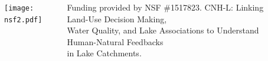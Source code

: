 \documentclass[final,hyperref={pdfpagelabels=false}]{beamer}
\begin{document}
\begin{frame}[t]
\begin{columns}[t]
\end{columns} %

\begin{columns}
\begin{column}{.015\textwidth}\end{column} %

\begin{column}{.25\textwidth}
\begin{flushright}
\texttt{[image: nsf2.pdf]} 
\end{flushright}
\end{column}

\begin{column}{.45\textwidth}
\small Funding provided by NSF \#1517823. CNH-L: Linking Land-Use Decision Making, \\
 \small Water Quality, and Lake Associations to Understand Human-Natural Feedbacks \\
 in Lake Catchments.
\end{column}

\begin{column}{.1\textwidth}\end{column} %
\end{columns}


\end{frame} %
\end{document}
